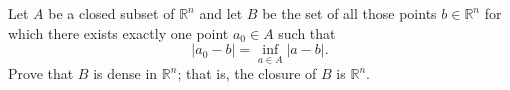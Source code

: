\documentclass{article}
\begin{document}
\setlength{\parindent}{0pt}
Let $A$ be a closed subset of $\mathbb{R}^{n}$ and let $B$ be the set of all those points $b\in\mathbb{R}^{n}$ for which there exists exactly one point $a_{0}\in A$ such that$$|a_{0}-b|=\inf_{a\in A}|a-b|.$$Prove that $B$ is dense in $\mathbb{R}^{n}$; that is, the closure of $B$ is $\mathbb{R}^{n}$.
\end{document}
